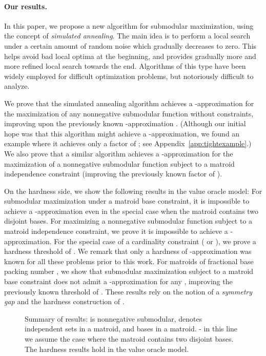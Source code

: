 \documentclass{article}[11pt]
\begin{document}
\paragraph{Our results.}
In this paper, we propose a new algorithm for submodular maximization, using
the concept of {\em simulated annealing}. The main idea is to perform a local search
under a certain amount of random noise which gradually decreases to zero.
This helps avoid bad local optima at the beginning,
and provides gradually more and more refined local search towards the end.
Algorithms of this type have been widely employed for difficult optimization problems,
but notoriously difficult to analyze.

We prove that the simulated annealing algorithm achieves a -approximation for the maximization
of any nonnegative submodular function without constraints, improving upon the previously known
-approximation \cite{FMV07}. (Although our initial hope was that this algorithm
might achieve a -approximation, we found an example where it
achieves only a factor of ; see Appendix~\ref{app:tightexample}.)
We also prove that a similar algorithm achieves a -approximation for the
maximization of a nonnegative submodular function subject to a matroid independence
constraint (improving the previously known factor of  \cite{Vondrak09}).

On the hardness side, we show the following results in the value oracle model:
For submodular maximization under a matroid base constraint, 
it is impossible to achieve a -approximation even in the special case
when the matroid contains two disjoint bases.
For maximizing a nonnegative submodular function subject to a matroid independence constraint,
we prove it is impossible to achieve a -approximation.
For the special case of a cardinality constraint (
or ), we prove a hardness threshold of .
We remark that only a hardness
of -approximation was known for all these problems prior to this work.
For matroids of fractional base packing number ,
we show that submodular maximization subject to a matroid base constraint
does not admit a -approximation for any ,
improving the previously known threshold of  \cite{Vondrak09}. 
These results rely on the notion of a {\em symmetry gap} and the hardness construction of
\cite{Vondrak09}.



\begin{figure}[here]

\caption{Summary of results:  is nonnegative submodular,
 denotes independent sets in a matroid, and
 bases in a matroid.  - in this line we assume the case
where the matroid contains two disjoint bases.
The hardness results hold in the value oracle model.}
\end{figure}
\end{document}
